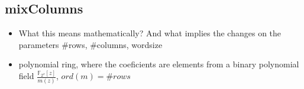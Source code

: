\documentclass[10pt,a4paper,twoside]{llncs}
\newcommand{\Fpn}[2]{\ensuremath{\mathbb{F}_{#1^#2}}}
\newcommand{\Fpnm}[2]{\ensuremath{\frac{\Fpn{2}{#1}[#2]}{m(#2)}}}
\begin{document}
\subsection{mixColumns}
\begin{itemize}
 \item What this means mathematically? And what implies the changes on the parameters \#rows, \#columns, wordsize
 \item polynomial ring, where the coeficients are elements from a binary polynomial field \Fpnm{x}{z}, $ord(m)=\#rows$
\end{itemize}

\end{document}

